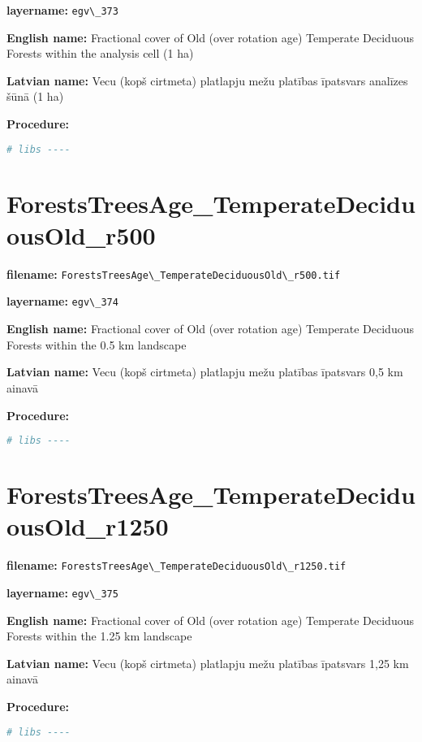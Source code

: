 \documentclass[
]{book}
\newcommand{\passthrough}[1]{#1}
\begin{document}
\textbf{layername:} \passthrough{\lstinline!egv\_373!}

\textbf{English name:} Fractional cover of Old (over rotation age) Temperate Deciduous Forests within the analysis cell (1 ha)

\textbf{Latvian name:} Vecu (kopš cirtmeta) platlapju mežu platības īpatsvars analīzes šūnā (1 ha)

\textbf{Procedure:}

\begin{lstlisting}[language=R]
# libs ----
\end{lstlisting}

\section{ForestsTreesAge\_TemperateDeciduousOld\_r500}\label{ch06.374}

\textbf{filename:} \passthrough{\lstinline!ForestsTreesAge\_TemperateDeciduousOld\_r500.tif!}

\textbf{layername:} \passthrough{\lstinline!egv\_374!}

\textbf{English name:} Fractional cover of Old (over rotation age) Temperate Deciduous Forests within the 0.5 km landscape

\textbf{Latvian name:} Vecu (kopš cirtmeta) platlapju mežu platības īpatsvars 0,5 km ainavā

\textbf{Procedure:}

\begin{lstlisting}[language=R]
# libs ----
\end{lstlisting}

\section{ForestsTreesAge\_TemperateDeciduousOld\_r1250}\label{ch06.375}

\textbf{filename:} \passthrough{\lstinline!ForestsTreesAge\_TemperateDeciduousOld\_r1250.tif!}

\textbf{layername:} \passthrough{\lstinline!egv\_375!}

\textbf{English name:} Fractional cover of Old (over rotation age) Temperate Deciduous Forests within the 1.25 km landscape

\textbf{Latvian name:} Vecu (kopš cirtmeta) platlapju mežu platības īpatsvars 1,25 km ainavā

\textbf{Procedure:}

\begin{lstlisting}[language=R]
# libs ----
\end{lstlisting}
\end{document}
